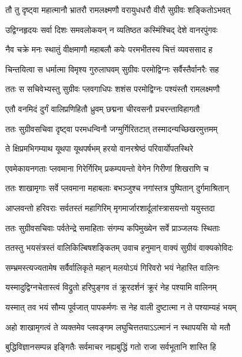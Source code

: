 
\twolineshloka
{तौ तु दृष्ट्वा महात्मानौ भ्रातरौ रामलक्ष्मणौ}
{वरायुधधरौ वीरौ सुग्रीवः शङ्कितोऽभवत्} %

\twolineshloka
{उद्विग्नहृदयः सर्वा दिशः समवलोकयन्}
{न व्यतिष्ठत कस्मिंश्चिद् देशे वानरपुंगवः} %

\twolineshloka
{नैव चक्रे मनः स्थातुं वीक्षमाणौ महाबलौ}
{कपेः परमभीतस्य चित्तं व्यवससाद ह} %

\twolineshloka
{चिन्तयित्वा स धर्मात्मा विमृश्य गुरुलाघवम्}
{सुग्रीवः परमोद्विग्नः सर्वैस्तैर्वानरैः सह} %

\twolineshloka
{ततः स सचिवेभ्यस्तु सुग्रीवः प्लवगाधिपः}
{शशंस परमोद्विग्नः पश्यंस्तौ रामलक्ष्मणौ} %

\twolineshloka
{एतौ वनमिदं दुर्गं वालिप्रणिहितौ ध्रुवम्}
{छद्मना चीरवसनौ प्रचरन्ताविहागतौ} %

\twolineshloka
{ततः सुग्रीवसचिवा दृष्ट्वा परमधन्विनौ}
{जग्मुर्गिरितटात् तस्मादन्यच्छिखरमुत्तमम्} %

\twolineshloka
{ते क्षिप्रमभिगम्याथ यूथपा यूथपर्षभम्}
{हरयो वानरश्रेष्ठं परिवार्योपतस्थिरे} %

\twolineshloka
{एवमेकायनगताः प्लवमाना गिरेर्गिरिम्}
{प्रकम्पयन्तो वेगेन गिरीणां शिखराणि च} %

\twolineshloka
{ततः शाखामृगाः सर्वे प्लवमाना महाबलाः}
{बभञ्जुश्च नगांस्तत्र पुष्पितान् दुर्गमाश्रितान्} %

\twolineshloka
{आप्लवन्तो हरिवराः सर्वतस्तं महागिरिम्}
{मृगमार्जारशार्दूलांस्त्रासयन्तो ययुस्तदा} %

\twolineshloka
{ततः सुग्रीवसचिवाः पर्वतेन्द्रे समाहिताः}
{संगम्य कपिमुख्येन सर्वे प्राञ्जलयः स्थिताः} %

\twolineshloka
{ततस्तु भयसंत्रस्तं वालिकिल्बिषशङ्कितम्}
{उवाच हनुमान् वाक्यं सुग्रीवं वाक्यकोविदः} %

\twolineshloka
{सम्भ्रमस्त्यज्यतामेष सर्वैर्वालिकृते महान्}
{मलयोऽयं गिरिवरो भयं नेहास्ति वालिनः} %

\twolineshloka
{यस्मादुद्विग्नचेतास्त्वं विद्रुतो हरिपुङ्गव}
{तं क्रूरदर्शनं क्रूरं नेह पश्यामि वालिनम्} %

\twolineshloka
{यस्मात् तव भयं सौम्य पूर्वजात् पापकर्मणः}
{स नेह वाली दुष्टात्मा न ते पश्याम्यहं भयम्} %

\twolineshloka
{अहो शाखामृगत्वं ते व्यक्तमेव प्लवङ्गम}
{लघुचित्ततयाऽऽत्मानं न स्थापयसि यो मतौ} %

\twolineshloka
{बुद्धिविज्ञानसम्पन्न इङ्गितैः सर्वमाचर}
{नह्यबुद्धिं गतो राजा सर्वभूतानि शास्ति हि} %

